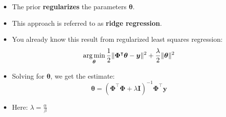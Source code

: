 \begin{frame}
	\begin{itemize}
		\item The prior \textbf{regularizes} the parameters $\bm{\theta}$.
		\item This approach is referred to as \textbf{ridge regression}.
		\item You already know this result from regularized least squares regression:
		\begin{equation}
			\operatorname*{arg\,min}_{\bm{\theta}} \frac{1}{2} \Vert \bm{\Phi}^{\intercal} \bm{\theta} - \bm{y} \Vert^2 + \frac{\lambda}{2} \Vert \bm{\theta} \Vert^2
		\end{equation}
		\item Solving for $\bm{\theta}$, we get the estimate:
		\begin{equation}
			\bm{\theta} = (\bm{\Phi}^{\intercal} \bm{\Phi} + \lambda \bm{I})^{-1} \bm{\Phi}^{\intercal} \bm{y}
		\end{equation}
		\item Here: $\lambda = \frac{\alpha}{\beta}$
	\end{itemize}
	
\end{frame}


